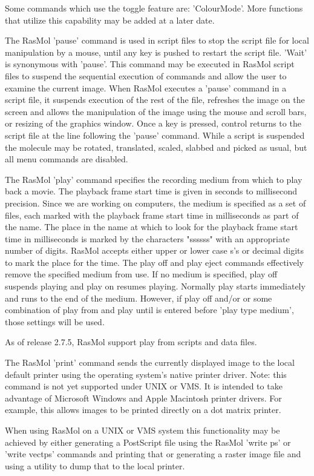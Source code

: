 Some commands which use the toggle feature are:
'ColourMode'.
More functions that utilize this capability may be added
at a later date.

The RasMol
'pause'
command is used in script files to stop the script file for local
manipulation by a mouse, until any key is pushed to restart the
script file.
'Wait'
is synonymous with
'pause'.
This command may be executed in RasMol script files to suspend
the sequential execution of commands and allow the user to examine
the current image.   When RasMol executes a
'pause'
command in a script file, it suspends  execution of the rest
of the file, refreshes the image on the screen and allows the
manipulation of the image using the mouse and scroll  bars, or
resizing of the graphics window.  Once a key is pressed, control
returns to the script file at the line following the
'pause'
command.  While a script is suspended the molecule may be rotated,
translated, scaled, slabbed and picked as usual, but all menu
commands are disabled.

The RasMol
'play'
command specifies the recording medium from which to play back a movie.
The playback frame start time is given in seconds to millisecond precision.
Since we are working on computers, the medium is specified as a set of files,
each marked with the playback frame start time in milliseconds as part of the
name. The place in the name at which to look for the playback frame start
time in milliseconds is marked by the characters "ssssss" with an
appropriate number of digits.  RasMol accepts either upper or lower case
s's or decimal digits to mark the place for the time.  The play off and play
eject commands effectively remove the specified medium from use. If no medium
is specified, play off suspends playing and play on resumes playing.
Normally play starts immediately and runs to the end of the medium. However,
if play off and/or or some combination of play from and play until is entered
before
'play type medium',
those settings will be used.

As of release 2.7.5, RasMol support play from scripts and data files.

The RasMol
'print'
command sends the currently displayed image to the local default printer
using the operating system's native printer driver. Note: this command
is not yet supported under UNIX or VMS. It is intended to take advantage
of Microsoft Windows and Apple Macintosh printer drivers. For example,
this allows images to be printed directly on a dot matrix printer.

When using RasMol on a UNIX or VMS system this functionality may be
achieved by either generating a PostScript file using the RasMol
'write ps'
or
'write vectps'
commands and printing that or generating a raster image file and using a
utility to dump that to the local printer.

